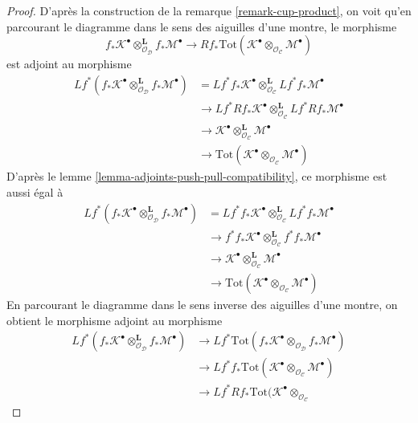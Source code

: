 \begin{proof}
D'après la construction de la remarque \ref{remark-cup-product}, on voit qu'en
parcourant le diagramme dans le sens des aiguilles d'une montre, le morphisme
$$
f_*\mathcal{K}^\bullet
\otimes_{\mathcal{O}_\mathcal{D}}^\mathbf{L}
f_*\mathcal{M}^\bullet 
\longrightarrow
Rf_*\text{Tot}(\mathcal{K}^\bullet
\otimes_{\mathcal{O}_\mathcal{C}}
\mathcal{M}^\bullet)
$$
est adjoint au morphisme
\begin{align*}
Lf^*(f_*\mathcal{K}^\bullet
\otimes_{\mathcal{O}_\mathcal{D}}^\mathbf{L}
f_*\mathcal{M}^\bullet)
& =
Lf^*f_*\mathcal{K}^\bullet
\otimes_{\mathcal{O}_\mathcal{C}}^\mathbf{L}
Lf^*f_*\mathcal{M}^\bullet \\
& \to
Lf^*Rf_*\mathcal{K}^\bullet
\otimes_{\mathcal{O}_\mathcal{C}}^\mathbf{L}
Lf^*Rf_*\mathcal{M}^\bullet \\
& \to
\mathcal{K}^\bullet
\otimes_{\mathcal{O}_\mathcal{C}}^\mathbf{L}
\mathcal{M}^\bullet \\
& \to
\text{Tot}(\mathcal{K}^\bullet
\otimes_{\mathcal{O}_\mathcal{C}}
\mathcal{M}^\bullet)
\end{align*}
D'après le lemme \ref{lemma-adjoints-push-pull-compatibility}, ce morphisme est aussi égal à
\begin{align*}
Lf^*(f_*\mathcal{K}^\bullet
\otimes_{\mathcal{O}_\mathcal{D}}^\mathbf{L}
f_*\mathcal{M}^\bullet)
& =
Lf^*f_*\mathcal{K}^\bullet
\otimes_{\mathcal{O}_\mathcal{C}}^\mathbf{L}
Lf^*f_*\mathcal{M}^\bullet \\
& \to
f^*f_*\mathcal{K}^\bullet
\otimes_{\mathcal{O}_\mathcal{C}}^\mathbf{L}
f^*f_*\mathcal{M}^\bullet \\
& \to
\mathcal{K}^\bullet
\otimes_{\mathcal{O}_\mathcal{C}}^\mathbf{L}
\mathcal{M}^\bullet \\
& \to
\text{Tot}(\mathcal{K}^\bullet
\otimes_{\mathcal{O}_\mathcal{C}}
\mathcal{M}^\bullet)
\end{align*}
En parcourant le diagramme dans le sens inverse des aiguilles d'une montre,
on obtient le morphisme adjoint au morphisme
\begin{align*}
Lf^*(f_*\mathcal{K}^\bullet
\otimes_{\mathcal{O}_\mathcal{D}}^\mathbf{L}
f_*\mathcal{M}^\bullet)
& \to
Lf^*\text{Tot}(
f_*\mathcal{K}^\bullet
\otimes_{\mathcal{O}_\mathcal{D}}
f_*\mathcal{M}^\bullet) \\
& \to
Lf^*f_*\text{Tot}(\mathcal{K}^\bullet
\otimes_{\mathcal{O}_\mathcal{C}}
\mathcal{M}^\bullet) \\
& \to
Lf^*Rf_*\text{Tot}(\mathcal{K}^\bullet
\otimes_{\mathcal{O}_\mathcal{C}}

\end{align*}
\end{proof}
